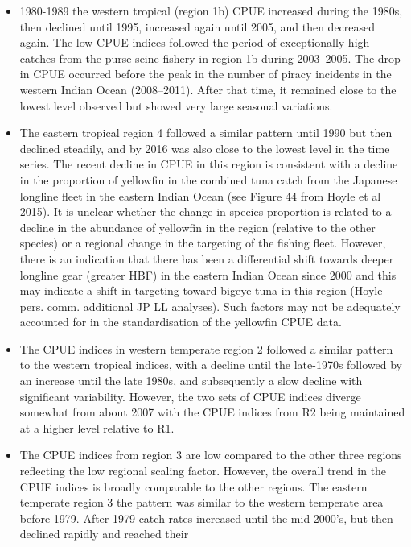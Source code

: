 \documentclass[
]{scrartcl}
\begin{document}
\begin{itemize}
\item
  1980-1989 the western tropical (region 1b) CPUE increased during the
  1980s, then declined until 1995, increased again until 2005, and then
  decreased again. The low CPUE indices followed the period of
  exceptionally high catches from the purse seine fishery in region 1b
  during 2003--2005. The drop in CPUE occurred before the peak in the
  number of piracy incidents in the western Indian Ocean (2008--2011).
  After that time, it remained close to the lowest level observed but
  showed very large seasonal variations.
\item
  The eastern tropical region 4 followed a similar pattern until 1990
  but then declined steadily, and by 2016 was also close to the lowest
  level in the time series. The recent decline in CPUE in this region is
  consistent with a decline in the proportion of yellowfin in the
  combined tuna catch from the Japanese longline fleet in the eastern
  Indian Ocean (see Figure 44 from Hoyle et al 2015). It is unclear
  whether the change in species proportion is related to a decline in
  the abundance of yellowfin in the region (relative to the other
  species) or a regional change in the targeting of the fishing fleet.
  However, there is an indication that there has been a differential
  shift towards deeper longline gear (greater HBF) in the eastern Indian
  Ocean since 2000 and this may indicate a shift in targeting toward
  bigeye tuna in this region (Hoyle pers. comm. additional JP LL
  analyses). Such factors may not be adequately accounted for in the
  standardisation of the yellowfin CPUE data.
\item
  The CPUE indices in western temperate region 2 followed a similar
  pattern to the western tropical indices, with a decline until the
  late-1970s followed by an increase until the late 1980s, and
  subsequently a slow decline with significant variability. However, the
  two sets of CPUE indices diverge somewhat from about 2007 with the
  CPUE indices from R2 being maintained at a higher level relative to
  R1.
\item
  The CPUE indices from region 3 are low compared to the other three
  regions reflecting the low regional scaling factor. However, the
  overall trend in the CPUE indices is broadly comparable to the other
  regions. The eastern temperate region 3 the pattern was similar to the
  western temperate area before 1979. After 1979 catch rates increased
  until the mid-2000's, but then declined rapidly and reached their

\end{itemize}
\end{document}
